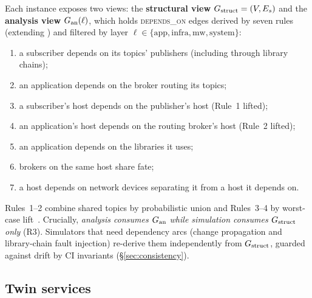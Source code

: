 Each instance exposes two views: the \textbf{structural view} $G_{\mathrm{struct}} = (V, E_s)$ and the \textbf{analysis view} $G_{\mathrm{an}}(\ell)$, which holds \textsc{depends\_on} edges derived by seven rules (extending \citealp{yigit2025graph}) and filtered by layer $\ell \in \{\text{app}, \text{infra}, \text{mw}, \text{system}\}$:
\begin{enumerate}[leftmargin=*,nosep]
  \item a subscriber depends on its topics' publishers (including through library chains);
  \item an application depends on the broker routing its topics;
  \item a subscriber's host depends on the publisher's host (Rule~1 lifted);
  \item an application's host depends on the routing broker's host (Rule~2 lifted);
  \item an application depends on the libraries it uses;
  \item brokers on the same host share fate;
  \item a host depends on network devices separating it from a host it depends on.
\end{enumerate}
Rules~1--2 combine shared topics by probabilistic union and Rules~3--4 by worst-case lift~\citep{sag-software}. Crucially, \emph{analysis consumes $G_{\mathrm{an}}$ while simulation consumes $G_{\mathrm{struct}}$ only} (R3). Simulators that need dependency arcs (change propagation and library-chain fault injection) re-derive them independently from $G_{\mathrm{struct}}$, guarded against drift by CI invariants (\S\ref{sec:consistency}).

\subsection{Twin services}
\label{sec:services}

